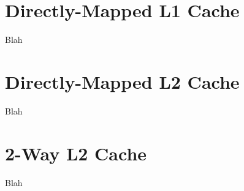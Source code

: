 \documentclass[12pt]{article}
\begin{document}
    \section{Directly-Mapped L1 Cache}

    Blah

    \section{Directly-Mapped L2 Cache}

    Blah

    \section{2-Way L2 Cache}

    Blah
\end{document}
